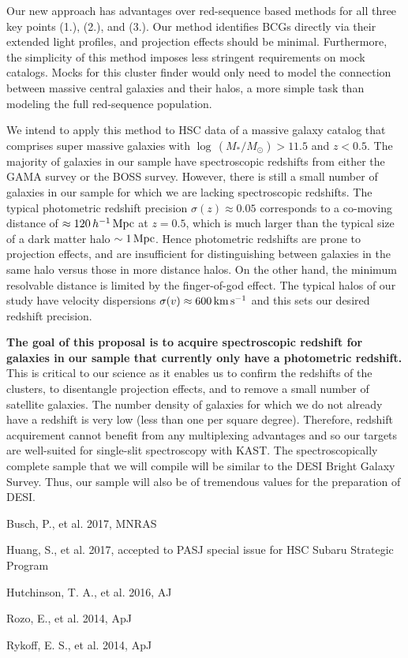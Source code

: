 \documentclass[letterpaper,12pt]{article}
\newenvironment{my_itemize}{
\begin{itemize}
  \setlength{\itemsep}{1pt}
  \setlength{\parskip}{0pt}
  \setlength{\parsep}{0pt}}{\end{itemize}
}
\begin{document}
Our new approach has advantages over red-sequence based methods for all three key points (1.), (2.), and (3.). Our
method identifies BCGs directly via their extended light profiles, and projection effects should be minimal.
Furthermore, the simplicity of this method imposes less stringent requirements on mock catalogs. Mocks for this cluster
finder would only need to model the connection between massive central galaxies and their halos, a more simple task
than modeling the full red-sequence population.

We intend to apply this method to HSC data of a massive galaxy catalog that comprises super massive galaxies with
$\log\,(M_*/M_\odot)>11.5$ and $z<0.5$. The majority of galaxies in our sample have spectroscopic redshifts from either
the GAMA survey or the BOSS survey. However, there is still a small number of galaxies in our sample for which we are
lacking spectroscopic redshifts. The typical photometric redshift precision $\sigma(z)\approx0.05$ corresponds to a
co-moving distance of $\approx120\,h^{-1}\,{\rm Mpc}$ at $z=0.5$, which is much larger than the typical size of a dark
matter halo $\sim1\,{\rm Mpc}$. Hence photometric redshifts are prone to projection effects, and are insufficient for
distinguishing between galaxies in the same halo versus those in more distance halos. On the other hand, the minimum
resolvable distance is limited by the finger-of-god effect. The typical halos of our study have velocity dispersions
$\sigma(v)\approx600\,{\rm km\,s^{-1}}$ and this sets our desired redshift precision.

\textbf{The goal of this proposal is to acquire spectroscopic redshift for galaxies in
our sample that currently only have a photometric redshift.} This is critical to our science as it enables
us to confirm the redshifts of the clusters, to disentangle projection effects, and to remove a small number of
satellite galaxies. The number density of galaxies for which we do not already have a redshift is very low (less than
one per square degree). Therefore, redshift acquirement cannot benefit from any multiplexing advantages and so our
targets are well-suited for single-slit spectroscopy with KAST. The spectroscopically complete sample that we will
compile will be similar to the DESI Bright Galaxy Survey. Thus, our sample will also be of tremendous values for the
preparation of DESI.

\clearpage

\begin{my_itemize}
\item Busch, P., et al. 2017, MNRAS
\item Huang, S., et al. 2017, accepted to PASJ special issue for HSC Subaru Strategic Program
\item Hutchinson, T. A., et al. 2016, AJ
\item Rozo, E., et al. 2014, ApJ
\item Rykoff, E. S., et al. 2014, ApJ
\end{my_itemize}
\end{document}
